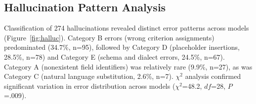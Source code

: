 \documentclass[applsci,article,submit,pdftex,oneauthor]{Definitions/mdpi}
\begin{document}
\subsection{Hallucination Pattern Analysis}
Classification of 274 hallucinations revealed distinct error patterns across
models (Figure~\ref{fig:halluc}). Category B errors (wrong criterion
assignments) predominated (34.7\%, n=95), followed by Category D (placeholder insertions, 28.5\%, n=78) and Category E (schema and dialect errors, 24.5\%, n=67). Category A (nonexistent field identifiers) was relatively rare (9.9\%, n=27), as was Category C (natural language substitution, 2.6\%, n=7). $\chi^2$
analysis confirmed significant variation in error distribution across models
($\chi^2$=48.2, $df$=28, $P$=.009).

\end{document}
